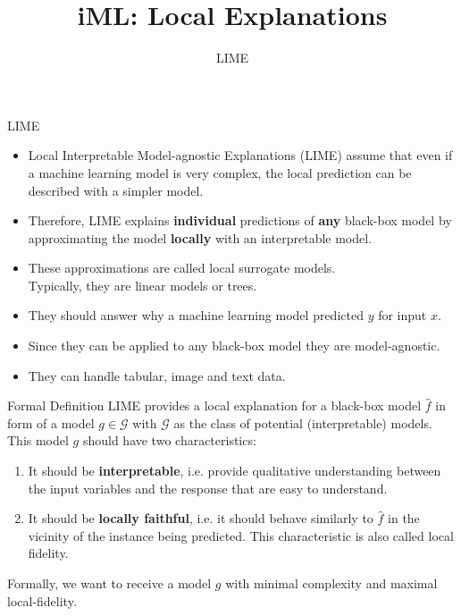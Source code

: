 \documentclass[aspectratio=169]{../latex_main/tntbeamer}  %
\title[Introduction]{iML: Local Explanations}
\subtitle{LIME}
\begin{document}
	
	\maketitle



\begin{frame}{LIME}
\begin{itemize}
		\item Local Interpretable Model-agnostic Explanations (LIME) assume that even if a machine learning model is very complex, \alert{the local prediction can be described with a simpler model}.
		\smallskip\pause
		\item  Therefore, LIME explains \textbf{individual} predictions of \textbf{any} black-box model by approximating the model \textbf{locally} with an interpretable model.
		\smallskip\pause
		\item These approximations are called local surrogate models.\\ Typically, they are linear models or trees.
		\smallskip\pause
		\item They should answer why a machine learning model predicted $y$ for input $x$.
		\smallskip\pause
		\item Since they can be applied to any black-box model they are model-agnostic.  
		\smallskip\pause
		\item They can handle tabular, image and text data. 
\end{itemize}
\end{frame}
\begin{frame}[c]{Formal Definition}
	LIME provides a local explanation for a black-box model $\hat{f}$ in form of a model $g \in \mathcal{G}$ with $\mathcal{G}$ as the class of potential (interpretable) models. This model $g$ should have two characteristics:
	\begin{enumerate}
		\item It should be \textbf{interpretable}, i.e. provide qualitative understanding between the input variables and the response that are easy to understand.  
		\item It should be \textbf{locally faithful}, i.e. it should behave similarly to $\hat{f}$ in the vicinity of the instance being predicted. This characteristic is also called local fidelity. 
	\end{enumerate}
	Formally, we want to receive a model $g$ with minimal complexity and maximal local-fidelity. 
\end{frame}
\end{document}
